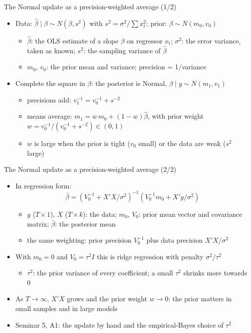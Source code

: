 \begin{frame}{The Normal update as a precision-weighted average (1/2)}
\itemsize{\small}
\begin{itemize}
    \item Data: $\hat\beta\mid\beta \sim N(\beta, s^2)$ with $s^2 = \sigma^2/\sum x_t^2$; prior: $\beta \sim N(m_0, v_0)$
    \begin{itemize}
        \item $\hat\beta$: the OLS estimate of a slope $\beta$ on regressor $x_t$; $\sigma^2$: the error variance, taken as known; $s^2$: the sampling variance of $\hat\beta$
        \item $m_0$, $v_0$: the prior mean and variance; precision = 1/variance
    \end{itemize}
    \item Complete the square in $\beta$: the posterior is Normal, $\beta\mid y \sim N(m_1, v_1)$
    \begin{itemize}
        \item precisions add: $v_1^{-1} = v_0^{-1} + s^{-2}$
        \item means average: $m_1 = w\,m_0 + (1 - w)\hat\beta$, with prior weight $w = v_0^{-1}/(v_0^{-1} + s^{-2}) \in (0, 1)$
        \item $w$ is large when the prior is tight ($v_0$ small) or the data are weak ($s^2$ large)
    \end{itemize}
\end{itemize}
\end{frame}

\begin{frame}{The Normal update as a precision-weighted average (2/2)}
\itemsize{\small}
\begin{itemize}
    \item In regression form: \[ \bar\beta = (V_0^{-1} + X'X/\sigma^2)^{-1}(V_0^{-1}m_0 + X'y/\sigma^2) \]
    \begin{itemize}
        \item $y$ ($T\times 1$), $X$ ($T\times k$): the data; $m_0$, $V_0$: prior mean vector and covariance matrix; $\bar\beta$: the posterior mean
        \item the same weighting: prior precision $V_0^{-1}$ plus data precision $X'X/\sigma^2$
    \end{itemize}
    \item With $m_0 = 0$ and $V_0 = \tau^2I$ this is ridge regression with penalty $\sigma^2/\tau^2$
    \begin{itemize}
        \item $\tau^2$: the prior variance of every coefficient; a small $\tau^2$ shrinks more towards 0
    \end{itemize}
    \item As $T \to \infty$, $X'X$ grows and the prior weight $w \to 0$: the prior matters in small samples and in large models
    \item Seminar 5, A1: the update by hand and the empirical-Bayes choice of $\tau^2$
\end{itemize}
\end{frame}

